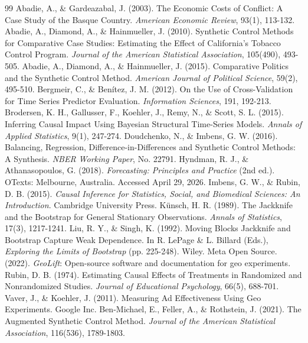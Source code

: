 \documentclass[11pt]{article}
\begin{document}
\begin{thebibliography}{99}
 Abadie, A., \& Gardeazabal, J. (2003). The Economic Costs of Conflict: A Case Study of the Basque Country. \emph{American Economic Review}, 93(1), 113-132.
 Abadie, A., Diamond, A., \& Hainmueller, J. (2010). Synthetic Control Methods for Comparative Case Studies: Estimating the Effect of California's Tobacco Control Program. \emph{Journal of the American Statistical Association}, 105(490), 493-505.
 Abadie, A., Diamond, A., \& Hainmueller, J. (2015). Comparative Politics and the Synthetic Control Method. \emph{American Journal of Political Science}, 59(2), 495-510.
 Bergmeir, C., \& Benítez, J. M. (2012). On the Use of Cross-Validation for Time Series Predictor Evaluation. \emph{Information Sciences}, 191, 192-213.
 Brodersen, K. H., Gallusser, F., Koehler, J., Remy, N., \& Scott, S. L. (2015). Inferring Causal Impact Using Bayesian Structural Time-Series Models. \emph{Annals of Applied Statistics}, 9(1), 247-274.
 Doudchenko, N., \& Imbens, G. W. (2016). Balancing, Regression, Difference-in-Differences and Synthetic Control Methods: A Synthesis. \emph{NBER Working Paper}, No. 22791.
 Hyndman, R. J., \& Athanasopoulos, G. (2018). \emph{Forecasting: Principles and Practice} (2nd ed.). OTexts: Melbourne, Australia. Accessed April 29, 2026.
 Imbens, G. W., \& Rubin, D. B. (2015). \emph{Causal Inference for Statistics, Social, and Biomedical Sciences: An Introduction}. Cambridge University Press.
 Künsch, H. R. (1989). The Jackknife and the Bootstrap for General Stationary Observations. \emph{Annals of Statistics}, 17(3), 1217-1241.
 Liu, R. Y., \& Singh, K. (1992). Moving Blocks Jackknife and Bootstrap Capture Weak Dependence. In R. LePage \& L. Billard (Eds.), \emph{Exploring the Limits of Bootstrap} (pp. 225-248). Wiley.
 Meta Open Source. (2022). \emph{GeoLift}: Open-source software and documentation for geo experiments.
 Rubin, D. B. (1974). Estimating Causal Effects of Treatments in Randomized and Nonrandomized Studies. \emph{Journal of Educational Psychology}, 66(5), 688-701.
 Vaver, J., \& Koehler, J. (2011). Measuring Ad Effectiveness Using Geo Experiments. Google Inc.
 Ben-Michael, E., Feller, A., \& Rothstein, J. (2021). The Augmented Synthetic Control Method. \emph{Journal of the American Statistical Association}, 116(536), 1789-1803.
\end{thebibliography}
\end{document}

